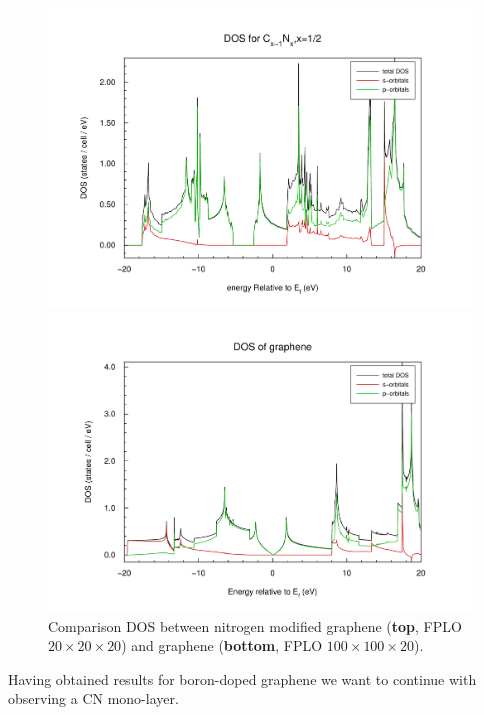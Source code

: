 				\begin{figure}
					\begin{minipage}[t]{\textwidth}
						\includegraphics[width=\textwidth]{Results/Nitrogen/Nitrogen1R/dos.pdf}
					\end{minipage}
					\begin{minipage}[t]{\textwidth}
						\includegraphics[width=\textwidth]{Results/Graphene/GrapheneNew/dos.pdf}
					\end{minipage}											
					\caption{Comparison DOS between nitrogen modified graphene (\textbf{top}, FPLO $20\times20\times20$) and graphene (\textbf{bottom}, FPLO $100\times100\times20$).}
					\label{fig:GrapheneNitrogenDOSComparisson}
				\end{figure}
				Having obtained results for boron-doped graphene we want to continue with observing a CN mono-layer. \\\\
